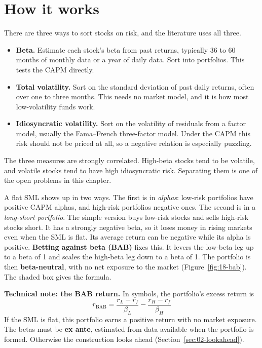 \section{How it works}
\label{sec:18-how}

There are three ways to sort stocks on risk, and the literature uses all three.

\begin{itemize}
  \item \textbf{Beta.} Estimate each stock's beta from past returns, typically 36 to 60 months of monthly data or a year of daily data. Sort into portfolios. This tests the CAPM directly.
  \item \textbf{Total volatility.} Sort on the standard deviation of past daily returns, often over one to three months. This needs no market model, and it is how most low-volatility funds work.
  \item \textbf{Idiosyncratic volatility.} Sort on the volatility of residuals from a factor model, usually the Fama--French three-factor model. Under the CAPM this risk should not be priced at all, so a negative relation is especially puzzling.
\end{itemize}

The three measures are strongly correlated. High-beta stocks tend to be volatile, and volatile stocks tend to have high idiosyncratic risk. Separating them is one of the open problems in this chapter.

A flat SML shows up in two ways. The first is in \emph{alphas}: low-risk portfolios have positive CAPM alphas, and high-risk portfolios negative ones. The second is in a \emph{long-short portfolio}. The simple version buys low-risk stocks and sells high-risk stocks short. It has a strongly negative beta, so it loses money in rising markets even when the SML is flat. Its average return can be negative while its alpha is positive. \textbf{Betting against beta (BAB)} fixes this. It levers the low-beta leg up to a beta of 1 and scales the high-beta leg down to a beta of 1. The portfolio is then \textbf{beta-neutral}, with no net exposure to the market (Figure~\ref{fig:18-bab}). The shaded box gives the formula.

\begin{technote}
\textbf{Technical note: the BAB return.} In symbols, the portfolio's excess return is
\begin{equation}
  r_{\mathrm{BAB}} = \frac{r_L - r_f}{\beta_L} - \frac{r_H - r_f}{\beta_H}
  \label{eq:18-bab}
\end{equation}
If the SML is flat, this portfolio earns a positive return with no market exposure. The betas must be \textbf{ex ante}, estimated from data available when the portfolio is formed. Otherwise the construction looks ahead (Section~\ref{sec:02-lookahead}).
\end{technote}

